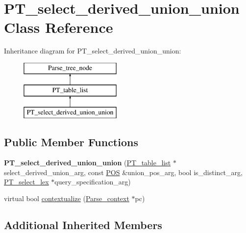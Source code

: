 \hypertarget{classPT__select__derived__union__union}{}\section{P\+T\+\_\+select\+\_\+derived\+\_\+union\+\_\+union Class Reference}
\label{classPT__select__derived__union__union}
Inheritance diagram for P\+T\+\_\+select\+\_\+derived\+\_\+union\+\_\+union\+:\begin{figure}[H]
\begin{center}
\leavevmode
\includegraphics[height=3.000000cm]{classPT__select__derived__union__union}
\end{center}
\end{figure}
\subsection*{Public Member Functions}
\begin{DoxyCompactItemize}
\item 
\mbox{\label{classPT__select__derived__union__union_a52c5775d3fd528956ba960343ae5362d}} 
{\bfseries P\+T\+\_\+select\+\_\+derived\+\_\+union\+\_\+union} (\mbox{\hyperlink{classPT__table__list}{P\+T\+\_\+table\+\_\+list}} $\ast$select\+\_\+derived\+\_\+union\+\_\+arg, const \mbox{\hyperlink{structYYLTYPE}{P\+OS}} \&union\+\_\+pos\+\_\+arg, bool is\+\_\+distinct\+\_\+arg, \mbox{\hyperlink{classPT__select__lex}{P\+T\+\_\+select\+\_\+lex}} $\ast$query\+\_\+specification\+\_\+arg)
\item 
virtual bool \mbox{\hyperlink{classPT__select__derived__union__union_a543c2b2f601f6de6e164547d6ba0c8e8}{contextualize}} (\mbox{\hyperlink{structParse__context}{Parse\+\_\+context}} $\ast$pc)
\end{DoxyCompactItemize}
\subsection*{Additional Inherited Members}


